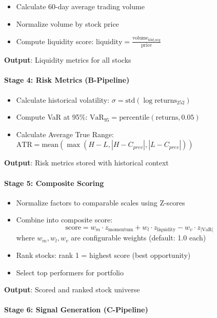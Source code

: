\documentclass[11pt, a4paper, twoside]{article}
\begin{document}
\begin{itemize}
    \item Calculate 60-day average trading volume
    \item Normalize volume by stock price
    \item Compute liquidity score: $\text{liquidity} = \frac{\text{volume}_{60d\_avg}}{\text{price}}$
\end{itemize}

\textbf{Output}: Liquidity metrics for all stocks

\paragraph{Stage 4: Risk Metrics (B-Pipeline)}

\begin{itemize}
    \item Calculate historical volatility: $\sigma = \text{std}(\log \text{returns}_{252})$
    \item Compute VaR at 95\%: $\text{VaR}_{95} = \text{percentile}(\text{returns}, 0.05)$
    \item Calculate Average True Range: $\text{ATR} = \text{mean}(\max(H-L, |H-C_{prev}|, |L-C_{prev}|))$
\end{itemize}

\textbf{Output}: Risk metrics stored with historical context

\paragraph{Stage 5: Composite Scoring}

\begin{itemize}
    \item Normalize factors to comparable scales using Z-scores
    \item Combine into composite score:
    \[
    \text{score} = w_m \cdot z_{\text{momentum}} + w_l \cdot z_{\text{liquidity}} - w_v \cdot z_{|\text{VaR}|}
    \]
    where $w_m, w_l, w_v$ are configurable weights (default: 1.0 each)
    \item Rank stocks: rank 1 = highest score (best opportunity)
    \item Select top performers for portfolio
\end{itemize}

\textbf{Output}: Scored and ranked stock universe

\paragraph{Stage 6: Signal Generation (C-Pipeline)}
\end{document}
